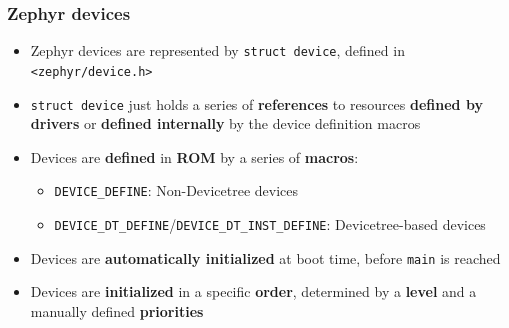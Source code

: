 \documentclass[handout]{beamer}
\begin{document}
\begin{frame}
  \frametitle{Zephyr devices}

  \begin{itemize}
    \item Zephyr devices are represented by \texttt{struct device},
          defined in \texttt{<zephyr/device.h>}
    \item \texttt{struct device} just holds a series of
          \textbf{references} to resources \textbf{defined by drivers} or
          \textbf{defined internally} by the device definition macros
    \item Devices are \textbf{defined} in \textbf{ROM} by a series of
          \textbf{macros}:
          \begin{itemize}
            \item \texttt{DEVICE\_DEFINE}: Non-Devicetree devices
            \item \texttt{DEVICE\_DT\_DEFINE}/\texttt{DEVICE\_DT\_INST\_DEFINE}:
                  Devicetree-based devices
          \end{itemize}
    \item Devices are \textbf{automatically initialized} at boot time, before
          \texttt{main} is reached
    \item Devices are \textbf{initialized} in a specific \textbf{order},
          determined by a \textbf{level} and a manually defined
          \textbf{priorities}
  \end{itemize}
\end{frame}
\end{document}
